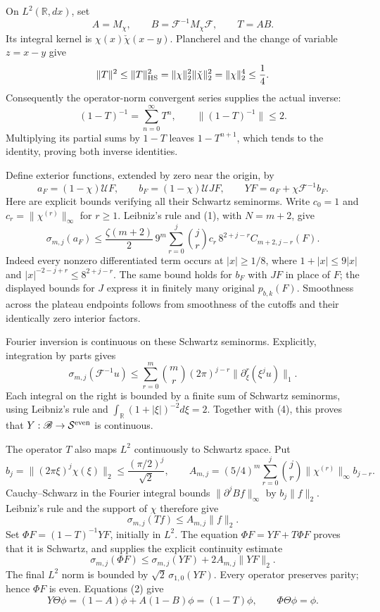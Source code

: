 \documentclass[10pt,a4paper,oneside]{report}
\begin{document}
On \(L^2(\mathbb R,dx)\), set \[
A=M_\chi,\qquad B=\mathcal F^{-1}M_\chi\mathcal F,\qquad T=AB.
\] Its integral kernel is \(\chi(x)\check\chi(x-y)\). Plancherel and the
change of variable \(z=x-y\) give \[
\|T\|^2\le\|T\|_{\rm HS}^2
=\|\chi\|_2^2\|\check\chi\|_2^2
=\|\chi\|_2^4\le\frac14.
\] Consequently the operator-norm convergent series supplies the actual
inverse: \[
\boxed{(1-T)^{-1}=\sum_{n=0}^{\infty}T^n,\qquad
\|(1-T)^{-1}\|\le2.}                                 \tag{3}
\] Multiplying its partial sums by \(1-T\) leaves \(1-T^{n+1}\), which
tends to the identity, proving both inverse identities.

Define exterior functions, extended by zero near the origin, by \[
a_F=(1-\chi)\mathcal UF,\qquad
b_F=(1-\chi)\mathcal UJF,\qquad
YF=a_F+\chi\mathcal F^{-1}b_F.
\] Here are explicit bounds verifying all their Schwartz seminorms.
Write \(c_0=1\) and \(c_r=\|\chi^{(r)}\|_\infty\) for \(r\ge1\).
Leibniz's rule and (1), with \(N=m+2\), give \[
\sigma_{m,j}(a_F)
\le\frac{\zeta(m+2)}2\,9^m
\sum_{r=0}^j\binom jr c_r\,8^{2+j-r}C_{m+2,j-r}(F).  \tag{4}
\] Indeed every nonzero differentiated term occurs at \(|x|\ge1/8\),
where \(1+|x|\le9|x|\) and \(|x|^{-2-j+r}\le8^{2+j-r}\). The same bound
holds for \(b_F\) with \(JF\) in place of \(F\); the displayed bounds
for \(J\) express it in finitely many original \(p_{b,k}(F)\).
Smoothness across the plateau endpoints follows from smoothness of the
cutoffs and their identically zero interior factors.

Fourier inversion is continuous on these Schwartz seminorms. Explicitly,
integration by parts gives \[
\sigma_{m,j}(\mathcal F^{-1}u)
\le\sum_{r=0}^m\binom mr(2\pi)^{j-r}
\bigl\|\partial_\xi^r(\xi^ju)\bigr\|_1.
\] Each integral on the right is bounded by a finite sum of Schwartz
seminorms, using Leibniz's rule and
\(\int_{\mathbb R}(1+|\xi|)^{-2}d\xi=2\). Together with (4), this proves
that \(Y:\mathscr B\to\mathcal S^{\rm even}\) is continuous.

The operator \(T\) also maps \(L^2\) continuously to Schwartz space. Put
\[
b_j=\|(2\pi\xi)^j\chi(\xi)\|_2
\le\frac{(\pi/2)^j}{\sqrt2},\qquad
A_{m,j}=(5/4)^m
\sum_{r=0}^j\binom jr\|\chi^{(r)}\|_\infty b_{j-r}.
\] Cauchy--Schwarz in the Fourier integral bounds
\(\|\partial^jBf\|_\infty\) by \(b_j\|f\|_2\). Leibniz's rule and the
support of \(\chi\) therefore give \[
\sigma_{m,j}(Tf)\le A_{m,j}\|f\|_2.
\] Set \(\Phi F=(1-T)^{-1}YF\), initially in \(L^2\). The equation
\(\Phi F=YF+T\Phi F\) proves that it is Schwartz, and supplies the
explicit continuity estimate \[
\sigma_{m,j}(\Phi F)
\le\sigma_{m,j}(YF)+2A_{m,j}\|YF\|_2.                 \tag{5}
\] The final \(L^2\) norm is bounded by \(\sqrt2\,\sigma_{1,0}(YF)\).
Every operator preserves parity; hence \(\Phi F\) is even. Equations (2)
give \[
Y\Theta\phi=(1-A)\phi+A(1-B)\phi=(1-T)\phi,
\qquad \Phi\Theta\phi=\phi.                          \tag{6}
\]
\end{document}
